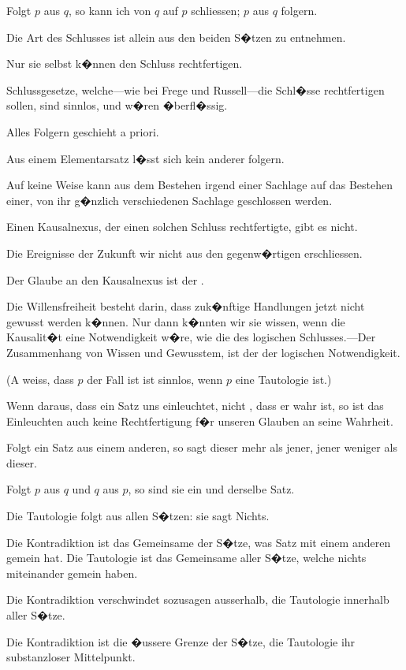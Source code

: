 {Folgt $p$ aus $q$, so kann ich von $q$ auf $p$ schliessen;
$p$ aus $q$ folgern.

Die Art des Schlusses ist allein aus den beiden
S�tzen zu entnehmen.

Nur sie selbst k�nnen den Schluss rechtfertigen.

{\stretchyspace
\glqq{}Schlussgesetze\grqq{}, welche---wie bei Frege und
Russell---die Schl�sse rechtfertigen sollen, sind
sinnlos, und w�ren �berfl�ssig.}}


{Alles Folgern geschieht a priori.}


{Aus einem Elementarsatz l�sst sich kein anderer
folgern.}


{Auf keine Weise kann aus dem Bestehen irgend
einer Sachlage auf das Bestehen einer, von ihr g�nzlich
verschiedenen Sachlage geschlossen werden.}


{Einen Kausalnexus, der einen solchen Schluss
rechtfertigte, gibt es nicht.}


{Die Ereignisse der Zukunft  wir nicht
aus den gegenw�rtigen erschliessen.

Der Glaube an den Kausalnexus ist der .}


{Die Willensfreiheit besteht darin, dass zuk�nftige
Handlungen jetzt nicht gewusst werden k�nnen.
Nur dann k�nnten wir sie wissen, wenn die Kausalit�t
eine  Notwendigkeit w�re, wie die
des logischen Schlusses.---Der Zusammenhang
von Wissen und Gewusstem, ist der der logischen
Notwendigkeit.

(\glqq{}A weiss, dass $p$ der Fall ist\grqq{} ist sinnlos, wenn
$p$ eine Tautologie ist.)}


{Wenn daraus, dass ein Satz uns einleuchtet,
nicht , dass er wahr ist, so ist das Einleuchten
auch keine Rechtfertigung f�r unseren
Glauben an seine Wahrheit.}


{Folgt ein Satz aus einem anderen, so sagt
dieser mehr als jener, jener weniger als dieser.}


{Folgt $p$ aus $q$ und $q$ aus $p$, so sind sie ein und
derselbe Satz.}


{Die Tautologie folgt aus allen S�tzen: sie sagt
Nichts.}


{Die Kontradiktion ist das Gemeinsame der
S�tze, was  Satz mit einem anderen gemein
hat. Die Tautologie ist das Gemeinsame aller
S�tze, welche nichts miteinander gemein haben.

Die Kontradiktion verschwindet sozusagen
ausserhalb, die Tautologie innerhalb aller S�tze.

Die Kontradiktion ist die �ussere Grenze der
S�tze, die Tautologie ihr substanzloser Mittelpunkt.}


